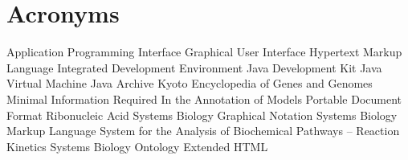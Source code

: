 \chapter{Acronyms}
\begin{acronym}
        {Application Programming Interface}
        {Graphical User Interface}
       {Hypertext Markup Language}
        {Integrated Development Environment}
        {Java\texttrademark{} Development Kit}
        {Java\texttrademark{} Virtual Machine}
        {Java\texttrademark{} Archive}
       {Kyoto Encyclopedia of Genes and Genomes}
     {Minimal Information Required In the Annotation of Models}
        {Portable Document Format}
        {Ribonucleic Acid}
       {Systems Biology Graphical Notation}
       {Systems Biology Markup Language}
   {System for the Analysis of Biochemical Pathways -- Reaction Kinetics}
        {Systems Biology Ontology}
      {Extended HTML}
\end{acronym}
